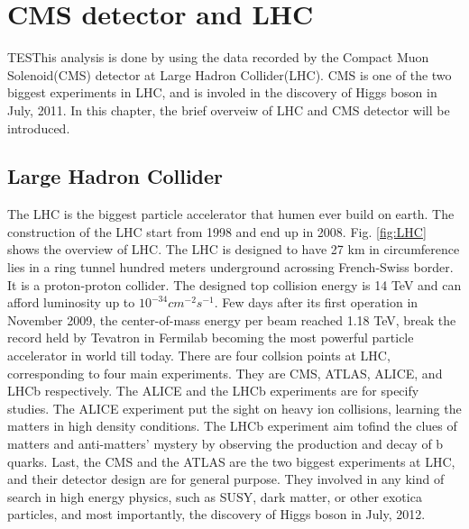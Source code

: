 \chapter{CMS detector and LHC}
TESThis analysis is done by using the data recorded by the Compact Muon Solenoid(CMS) detector at Large Hadron Collider(LHC). CMS is one of the two biggest experiments in LHC, and is involed in the discovery of Higgs boson in July, 2011. In this chapter, the brief overveiw of LHC and CMS detector will be introduced.

\section{Large Hadron Collider} 
The LHC is the biggest particle accelerator that humen ever build on earth. The construction of the LHC start from 1998 and end up in 2008. Fig. \ref{fig:LHC} shows the overview of LHC. The LHC is designed to have 27 km in circumference lies in a ring tunnel hundred meters underground acrossing French-Swiss border. It is a proton-proton collider. The designed top collision energy is 14 TeV and can afford luminosity up to $10^{-34} cm^{-2}s^{-1}$. Few days after its first operation in November 2009, the center-of-mass energy per beam reached 1.18 TeV, break the record held by Tevatron in Fermilab becoming the most powerful particle accelerator in world till today.     
\newline There are four collsion points at LHC, corresponding to four main experiments. They are CMS, ATLAS, ALICE, and LHCb respectively. The ALICE and the LHCb experiments are for specify studies. The ALICE experiment put the sight on heavy ion collisions, learning the matters in high density conditions. The LHCb experiment aim tofind the clues of matters and anti-matters' mystery by observing the production and decay of b quarks. Last, the CMS and the ATLAS are the two biggest experiments at LHC, and their detector design are for general purpose. They involved in any kind of search in high energy physics, such as SUSY, dark matter, or other exotica particles, and most importantly, the discovery of Higgs boson in July, 2012.  

